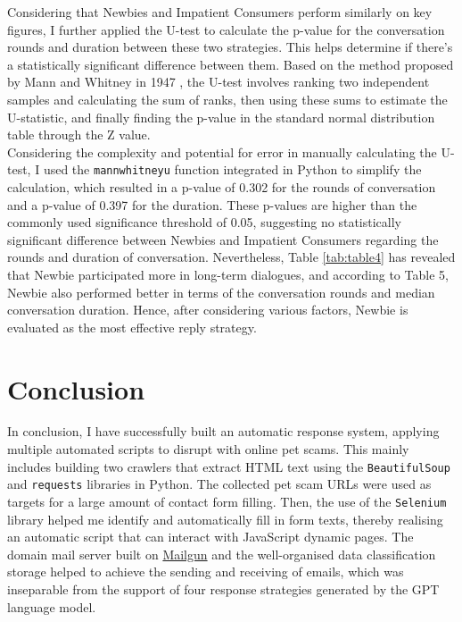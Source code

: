 \documentclass[ oneside,%
                    author={Cassie Qing Tang},
                    degree={BSc},
                     title={An Automated Response System for Disrupting Online Pet Scamming \\ },
                    subtitle={ }]{dissertation}
\begin{document}
Considering that Newbies and Impatient Consumers perform similarly on key figures, I further applied the U-test to calculate the p-value for the conversation rounds and duration between these two strategies. This helps determine if there's a statistically significant difference between them. Based on the method proposed by Mann and Whitney in 1947 \cite{mann_test_1947}, the U-test involves ranking two independent samples and calculating the sum of ranks, then using these sums to estimate the U-statistic, and finally finding the p-value in the standard normal distribution table through the Z value.
\\

Considering the complexity and potential for error in manually calculating the U-test, I used the \texttt{mannwhitneyu} function \cite{noauthor_scipystatsmannwhitneyu_nodate} integrated in Python to simplify the calculation, which resulted in a p-value of 0.302 for the rounds of conversation and a p-value of 0.397 for the duration. These p-values are higher than the commonly used significance threshold of 0.05, suggesting no statistically significant difference between Newbies and Impatient Consumers regarding the rounds and duration of conversation. Nevertheless, Table \ref{tab:table4} has revealed that Newbie participated more in long-term dialogues, and according to Table 5, Newbie also performed better in terms of the conversation rounds and median conversation duration. Hence, after considering various factors, Newbie is evaluated as the most effective reply strategy.

\chapter{Conclusion}
In conclusion, I have successfully built an automatic response system, applying multiple automated scripts to disrupt with online pet scams. This mainly includes building two crawlers that extract HTML text using the \texttt{BeautifulSoup} and \texttt{requests} libraries in Python. The collected pet scam URLs were used as targets for a large amount of contact form filling. Then, the use of the \texttt{Selenium} library helped me identify and automatically fill in form texts, thereby realising an automatic script that can interact with JavaScript dynamic pages. The domain mail server built on \href{www.mailgun.com}{Mailgun} and the well-organised data classification storage helped to achieve the sending and receiving of emails, which was inseparable from the support of four response strategies generated by the GPT language model.
\\
\end{document}
